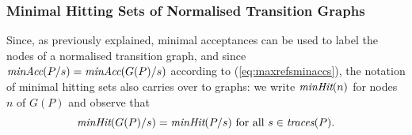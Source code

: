 \subsubsection*{Minimal Hitting Sets of Normalised Transition Graphs}
Since, as previously explained, minimal acceptances can be used to label the
nodes of a normalised transition graph, and since $\text{\it minAcc}(P/s) =
\text{\it minAcc}(G(P)/s)$ according to (\ref{eq:maxrefsminaccs}), the notation of
minimal hitting sets also carries over to graphs: we write $\text{\it minHit}(n)$ for
nodes $n$ of $G(P)$ and observe that
\begin{equation}
\label{eq:minhitsGP}
\text{\it minHit}(G(P)/s) = \text{\it minHit}(P/s) \ \text{for all}\ s\in \text{\it traces}(P).
\end{equation}

